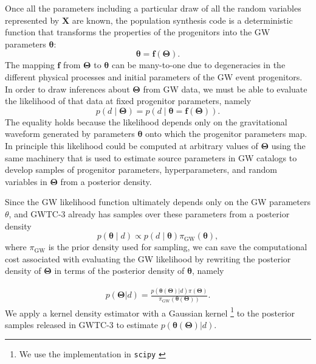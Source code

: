\documentclass[twocolumn]{aastex631}
\begin{document}
Once all the parameters including a particular draw of all the random variables
represented by $\bm{X}$ are known, the population synthesis code is a
deterministic function that transforms the properties of the progenitors into
the GW parameters $\bm{\theta}$:
\begin{equation}
    \bm{\theta} = \bm{f}\left( \bm{\Theta} \right).
\end{equation}
The mapping $\bm{f}$ from $\bm{\Theta}$ to $\bm{\theta}$ can be many-to-one due
to degeneracies in the different physical processes and initial parameters of
the GW event progenitors. In order to draw inferences about $\bm{\Theta}$ from
GW data, we must be able to evaluate the likelihood of that data at fixed
progenitor parameters, namely
\begin{equation}
    p\left( d \mid \bm{\Theta} \right) = p\left( d \mid \bm{\theta} = \bm{f}\left( \bm{\Theta} \right) \right).
\end{equation}
The equality holds because the likelihood depends only on the gravitational
waveform generated by parameters $\bm{\theta}$ onto which the progenitor
parameters map.  In principle this likelihood could be computed at arbitrary
values of $\bm{\Theta}$ using the same machinery that is used to estimate source
parameters in GW catalogs \citep{Veitch2015,Ashton2019,Romero-Shaw2020,GWTC-3}
to develop samples of progenitor parameters, hyperparameters, and random
variables in $\bm{\Theta}$ from a posterior density.

Since the GW likelihood function ultimately depends only on the GW parameters
$\theta$, and GWTC-3 already has samples over these parameters from a posterior
density
\begin{equation}
    p\left( \bm{\theta} \mid d \right) \propto p\left( d \mid \bm{\theta} \right) \pi_\mathrm{GW} \left( \bm{\theta} \right),
\end{equation}
where $\pi_\mathrm{GW}$ is the prior density used for sampling, we can save the
computational cost associated with evaluating the GW likelihood by rewriting the
posterior density of $\bm{\Theta}$ in terms of the posterior density of
$\bm{\theta}$, namely

\begin{align}
    p(\bm{\Theta} | d) = \frac{p(\bm{\theta}(\bm{\Theta})| d) \pi(\bm{\Theta})}{\pi_\mathrm{GW}(\bm{\theta}(\bm{\Theta}))}.
\end{align}
We apply a kernel density estimator with a Gaussian kernel \footnote{We use the
implementation in \texttt{scipy} \cite{2020SciPy-NMeth}} to the posterior
samples released in GWTC-3 to estimate $p(\bm{\theta}(\bm{\Theta})|d)$. 
\end{document}
